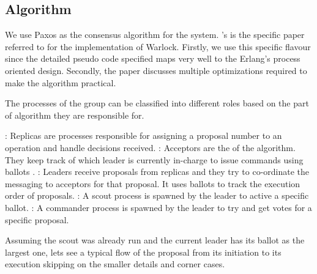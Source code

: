 \subsection{Algorithm}

We use Paxos  as the consensus algorithm for the system.
\citet{Robbert2011}'s  is the specific paper
referred to for the implementation of
Warlock. Firstly, we use this specific flavour since the detailed pseudo code
specified maps very well to the Erlang's process oriented%
 design. Secondly, the paper discusses multiple optimizations required to make
the algorithm practical.

The processes of the group can be classified into different roles based on the
part of algorithm they are responsible for.

\begin{itemize}
    : Replicas are processes responsible for assigning a proposal
    number to an operation and handle decisions received.
    : Acceptors are the  of the algorithm. They keep
    track of which leader is currently in-charge to issue commands using
    ballots%
    .
    : Leaders receive proposals from replicas and they try to
    co-ordinate the messaging to acceptors for that proposal. It uses ballots
    to track the execution order of proposals.
    : A scout process is spawned by the leader to active a specific
    ballot.
    : A commander process is spawned by the leader to try
    and get votes for a specific proposal.
\end{itemize}

Assuming the scout was already run and the current leader has its ballot as the
largest one, lets see a typical flow of the proposal from its initiation to its
execution skipping on the smaller details and corner cases.


